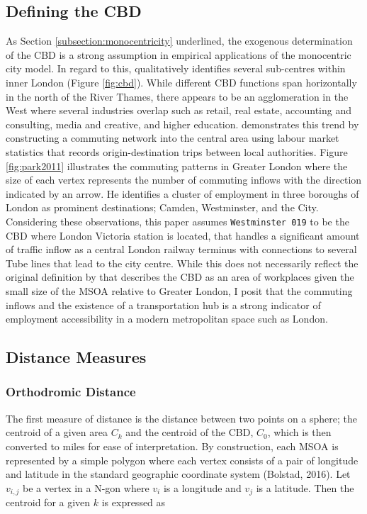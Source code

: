 \documentclass{article}
\begin{document}
\subsection{Defining the CBD}\label{subsection:CBD}
As Section \ref{subsection:monocentricity} underlined, the exogenous determination of the CBD is a strong assumption in empirical applications of the monocentric city model. In regard to this, \citet{GreaterLondonAuthority2008LondonsImportance} qualitatively identifies several sub-centres within inner London (Figure \ref{fig:cbd}). While different CBD functions span horizontally in the north of the River Thames, there appears to be an agglomeration in the West where several industries overlap such as retail, real estate, accounting and consulting, media and creative, and higher education. \citet{Park2011SpatialAngeles} demonstrates this trend by constructing a commuting network into the central area using labour market statistics that records origin-destination trips between local authorities. Figure \ref{fig:park2011} illustrates the commuting patterns in Greater London where the size of each vertex represents the number of commuting inflows with the direction indicated by an arrow. He identifies a cluster of employment in three boroughs of London as prominent destinations; Camden, Westminster, and the City. Considering these observations, this paper assumes  \texttt{Westminster 019} to be the CBD where London Victoria station is located, that handles a significant amount of traffic inflow as a central London railway terminus with connections to several Tube lines that lead to the city centre. While this does not necessarily reflect the original definition by \citet{AlonsoWilliam1964Lalu} that describes the CBD as an area of workplaces given the small size of the MSOA relative to Greater London, I posit that the commuting inflows and the existence of a transportation hub is a strong indicator of employment accessibility in a modern metropolitan space such as London.

\subsection{Distance Measures}
\subsubsection{Orthodromic Distance}
The first measure of distance is the distance between two points on a sphere; the centroid of a given area $C_k$ and the centroid of the CBD, $C_0$, which is then converted to miles for ease of interpretation. By construction, each MSOA is represented by a simple polygon where each vertex consists of a pair of longitude and latitude in the standard geographic coordinate system (Bolstad, 2016). Let $v_{i,j}$ be a vertex in a N-gon where $v_i$ is a longitude and $v_j$ is a latitude. Then the centroid for a given $k$ is expressed as 
\end{document}
